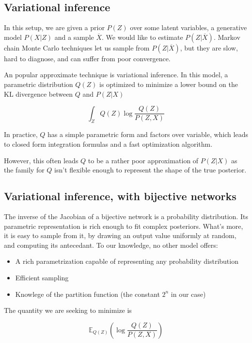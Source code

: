 \documentclass{article}
\begin{document}
\subsection{Variational inference}

In this setup, we are given a prior \(P(Z)\) over some latent variables,
a generative model \(P(X | Z)\) and a sample \(\overline{X}\). We would like to
estimate \(P(Z | \overline{X})\). Markov chain Monte Carlo techniques let us
sample from \(P(Z | \overline{X})\), but they are slow, hard to diagnose, and
can suffer from poor convergence.

An popular approximate technique is variational inference. In this model, a
parametric distribution \(Q(Z)\) is optimized to minimize a lower bound
on the KL divergence between \(Q\) and \(P(Z | X)\)

\[
  \int_{Z} Q(Z) \log \frac{Q(Z)}{P(Z, X)}
\]

In practice, \(Q\) has a simple parametric form and factors over variable,
which leads to closed form integration formulas and a fast optimization
algorithm.

However, this often leads \(Q\) to be a rather poor approximation of
\(P(Z | X)\) as the family for \(Q\) isn't flexible enough to represent
the shape of the true posterior.

\subsection{Variational inference, with bijective networks}

The inverse of the Jacobian of a bijective network is a probability
distribution. Its parametric representation is rich enough to fit
complex posteriors. What's more, it is easy to sample from it, by drawing an
output value uniformly at random, and computing its antecedant. To our
knowledge, no other model offers:

\begin{itemize}
\item A rich parametrization capable of representing any probability distribution
\item Efficient sampling
\item Knowlege of the partition function (the constant \(2^n\) in our case)
\end{itemize}

The quantity we are seeking to minimize is

\[
  \mathbb{E}_{Q(Z)} \left(\log \frac{Q(Z)}{P(Z,X)} \right)
\]
\end{document}
